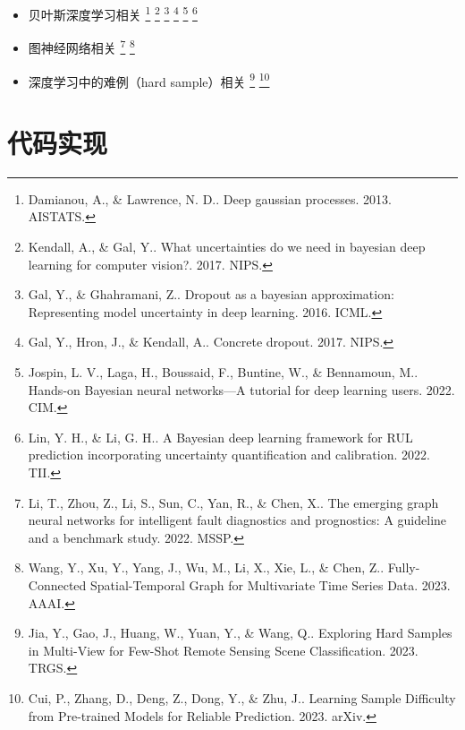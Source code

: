 \documentclass[10pt,aspectratio=43,mathserif]{beamer}
\begin{document}
\begin{frame}
\begin{itemize}
\end{itemize}
\end{frame}

\begin{frame}
  \begin{itemize}
    \item 贝叶斯深度学习相关
    \footnote{Damianou, A., \& Lawrence, N. D.. Deep gaussian processes. 2013. AISTATS.}
    \footnote{Kendall, A., \& Gal, Y.. What uncertainties do we need in bayesian deep learning for computer vision?. 2017. NIPS.}
    \footnote{Gal, Y., \& Ghahramani, Z.. Dropout as a bayesian approximation: Representing model uncertainty in deep learning. 2016. ICML.}
    \footnote{Gal, Y., Hron, J., \& Kendall, A.. Concrete dropout. 2017. NIPS.}
    \footnote{Jospin, L. V., Laga, H., Boussaid, F., Buntine, W., \& Bennamoun, M.. Hands-on Bayesian neural networks—A tutorial for deep learning users. 2022. CIM.}
    \footnote{Lin, Y. H., \& Li, G. H.. A Bayesian deep learning framework for RUL prediction incorporating uncertainty quantification and calibration. 2022. TII.}
    \item 图神经网络相关
    \footnote{Li, T., Zhou, Z., Li, S., Sun, C., Yan, R., \& Chen, X.. The emerging graph neural networks for intelligent fault diagnostics and prognostics: A guideline and a benchmark study. 2022. MSSP.}
    \footnote{Wang, Y., Xu, Y., Yang, J., Wu, M., Li, X., Xie, L., \& Chen, Z.. Fully-Connected Spatial-Temporal Graph for Multivariate Time Series Data. 2023. AAAI.}
    \item 深度学习中的难例（hard sample）相关
    \footnote{Jia, Y., Gao, J., Huang, W., Yuan, Y., \& Wang, Q.. Exploring Hard Samples in Multi-View for Few-Shot Remote Sensing Scene Classification. 2023. TRGS.}
    \footnote{Cui, P., Zhang, D., Deng, Z., Dong, Y., \& Zhu, J.. Learning Sample Difficulty from Pre-trained Models for Reliable Prediction. 2023. arXiv.}
  \end{itemize}
\end{frame}

\section{代码实现}
\end{document}
